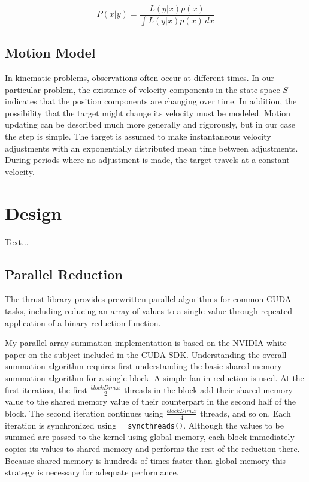 \documentclass{article}
\begin{document}
\begin{equation}\label{lfunc2}
P(x|y) = \frac{L(y|x)p(x)}{\int \! L(y|x)p(x) \, dx}
\end{equation}

\subsection{Motion Model}
In kinematic problems, observations often occur at different times. In our particular problem, the existance of velocity components in the state space \(S\) indicates that the position components are changing over time. In addition, the possibility that the target might change its velocity must be modeled. Motion updating can be described much more generally and rigorously, but in our case the step is simple. The target is assumed to make instantaneous velocity adjustments with an exponentially distributed mean time between adjustments. During periods where no adjustment is made, the target travels at a constant velocity.

\section{Design}
Text...
\subsection{Parallel Reduction}
The thrust library provides prewritten parallel algorithms for common CUDA tasks, including reducing an array of values to a single value through repeated application of a binary reduction function.\cite{thrust}

My parallel array summation implementation is based on the NVIDIA white paper on the subject included in the CUDA SDK.\cite{oprc} Understanding the overall summation algorithm requires first understanding the basic shared memory summation algorithm for a single block. A simple fan-in reduction is used. At the first iteration, the first \(\frac{blockDim.x}{2}\) threads in the block add their shared memory value to the shared memory value of their counterpart in the second half of the block. The second iteration continues using \(\frac{blockDim.x}{4}\) threads, and so on. Each iteration is synchronized using \verb!__syncthreads()!. Although the values to be summed are passed to the kernel using global memory, each block immediately copies its values to shared memory and performs the rest of the reduction there. Because shared memory is hundreds of times faster than global memory\cite{tutorial1} this strategy is necessary for adequate performance.
\end{document}
